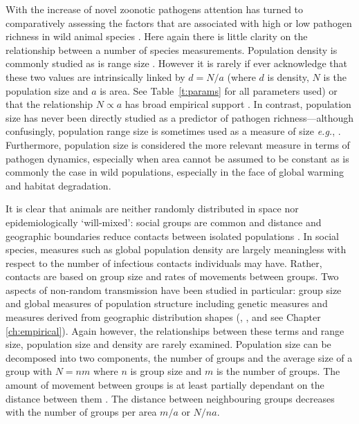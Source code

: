 With the increase of novel zoonotic pathogens \cite{jones2008global} attention has turned to comparatively assessing the factors that are associated with high or low pathogen richness in wild animal species \cite{poulin2000diversity}.
Here again there is little clarity on the relationship between a number of species measurements.
Population density is commonly studied \cite{morand1998density, kamiya2014determines, lindenfors2007parasite, nunn2003comparative, arneberg2002host} as is range size \cite{lindenfors2007parasite, nunn2003comparative, turmelle2009correlates, huang2015parasite, kamiya2014determines}.
However it is rarely if ever acknowledge that these two values are intrinsically linked by $d = N/a$ (where $d$ is density, $N$ is the population size and $a$ is area. See Table~\ref{t:params} for all parameters used) or that the relationship $N \propto a$ has broad empirical support \cite{blackburn2006variations, borregaard2010causality}.
In contrast, population size has never been directly studied as a predictor of pathogen richness---although confusingly, population range size is sometimes used as a measure of size \emph{e.g.}, \cite{vogeli2011island}.
Furthermore, population size is considered the more relevant measure in terms of pathogen dynamics, especially when area cannot be assumed to be constant \cite{begon2002clarification} as is commonly the case in wild populations, especially in the face of global warming and habitat degradation.

It is clear that animals are neither randomly distributed in space nor epidemiologically `will-mixed': social groups are common \cite{kerth2008causes} and distance and geographic boundaries reduce contacts between isolated populations \cite{jenkins2010meta, peel2012henipavirus}.
In social species, measures such as global population density are largely meaningless with respect to the number of infectious contacts individuals may have.
Rather, contacts are based on group size and rates of movements between groups.
Two aspects of non-random transmission have been studied in particular: group size \cite{vitone2004body, gay2014parasite, ezenwa2006host, rifkin2012animals, nunn2003comparative} and global measures of population structure including genetic measures and measures derived from geographic distribution shapes (\textcite{gay2014parasite}, \textcite{maganga2014bat}, \textcite{turmelle2009correlates} and see Chapter \ref{ch:empirical}).
Again however, the relationships between these terms and range size, population size and density are rarely examined.
Population size can be decomposed into two components, the number of groups and the average size of a group with $N = nm$ where $n$ is group size and $m$ is the number of groups.
The amount of movement between groups is at least partially dependant on the distance between them \cite{jenkins2010meta, le2012patterns, schooley2009enhancing}.
The distance between neighbouring groups decreases with the number of groups per area $m/a$ or $N/na$.

